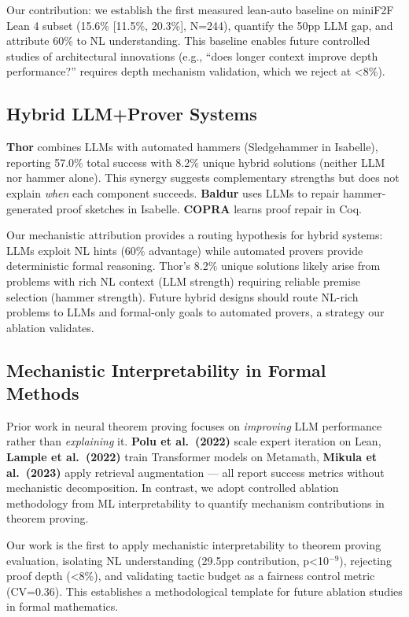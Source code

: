 Our contribution: we establish the first measured lean-auto baseline on miniF2F Lean 4 subset (15.6\% [11.5\%, 20.3\%], N=244), quantify the 50pp LLM gap, and attribute 60\% to NL understanding. This baseline enables future controlled studies of architectural innovations (e.g., ``does longer context improve depth performance?'' requires depth mechanism validation, which we reject at <8\%).

\subsection{Hybrid LLM+Prover Systems}

\textbf{Thor} \cite{Thor_2022} combines LLMs with automated hammers (Sledgehammer in Isabelle), reporting 57.0\% total success with 8.2\% unique hybrid solutions (neither LLM nor hammer alone). This synergy suggests complementary strengths but does not explain \emph{when} each component succeeds. \textbf{Baldur} \cite{Baldur_2023} uses LLMs to repair hammer-generated proof sketches in Isabelle. \textbf{COPRA} \cite{COPRA_2023} learns proof repair in Coq.

Our mechanistic attribution provides a routing hypothesis for hybrid systems: LLMs exploit NL hints (60\% advantage) while automated provers provide deterministic formal reasoning. Thor's 8.2\% unique solutions likely arise from problems with rich NL context (LLM strength) requiring reliable premise selection (hammer strength). Future hybrid designs should route NL-rich problems to LLMs and formal-only goals to automated provers, a strategy our ablation validates.

\subsection{Mechanistic Interpretability in Formal Methods}

Prior work in neural theorem proving focuses on \emph{improving} LLM performance rather than \emph{explaining} it. \textbf{Polu et al.\ (2022)} \cite{Polu_ExpertIteration_2022} scale expert iteration on Lean, \textbf{Lample et al.\ (2022)} \cite{Lample_Metamath_2022} train Transformer models on Metamath, \textbf{Mikula et al.\ (2023)} \cite{Mikula_RetrievalAugmentation_2023} apply retrieval augmentation --- all report success metrics without mechanistic decomposition. In contrast, we adopt controlled ablation methodology from ML interpretability \cite{Geiger_CausalAbstraction_2021,Elhage_TransformerCircuits_2021} to quantify mechanism contributions in theorem proving.

Our work is the first to apply mechanistic interpretability to theorem proving evaluation, isolating NL understanding (29.5pp contribution, p<10$^{-9}$), rejecting proof depth (<8\%), and validating tactic budget as a fairness control metric (CV=0.36). This establishes a methodological template for future ablation studies in formal mathematics.
